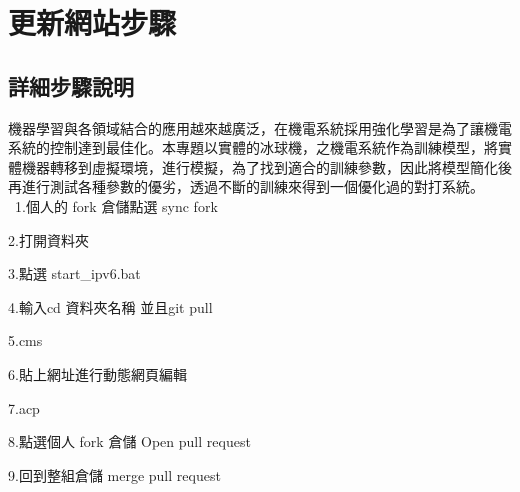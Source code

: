 \chapter{更新網站步驟}
\renewcommand{\baselinestretch}{10.0} %
\setcounter{page}{1}  %
\fontsize{14pt}{2.5pt}\sectionef
\section{詳細步驟說明}
機器學習與各領域結合的應用越來越廣泛，在機電系統採用強化學習是為了讓機電系統的控制達到最佳化。本專題以實體的冰球機，之機電系統作為訓練模型，將實體機器轉移到虛擬環境，進行模擬，為了找到適合的訓練參數，因此將模型簡化後再進行測試各種參數的優劣，透過不斷的訓練來得到一個優化過的對打系統。\\
\
1.個人的 fork 倉儲點選 sync fork 

2.打開資料夾 

3.點選 start_ipv6.bat 

4.輸入cd 資料夾名稱 並且git pull 

5.cms 

6.貼上網址進行動態網頁編輯 

7.acp 

8.點選個人 fork 倉儲 Open pull request 

9.回到整組倉儲 merge pull request
